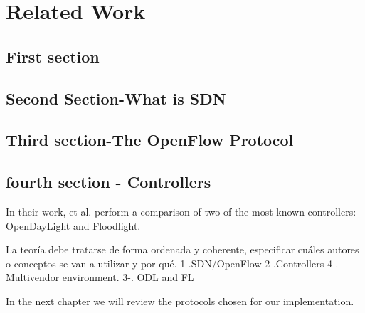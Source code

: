 \chapter{Related Work}\label{ch:relwork}

\section{First section}


\bigskip
\section{Second Section-What is SDN}
\bigskip
\section{Third section-The OpenFlow Protocol}
\bigskip
\section{fourth section - Controllers}
In their work, et al.\cite{rowshanrad2016performance} perform a comparison of two of the most known controllers: OpenDayLight and Floodlight.
\bigskip


La teoría debe tratarse de forma ordenada y coherente, especificar cuáles autores o conceptos se van a utilizar y por qué.
1-.SDN/OpenFlow
2-.Controllers
4-. Multivendor environment.
3-. ODL and FL


In the next chapter we will review the protocols chosen for our implementation.
